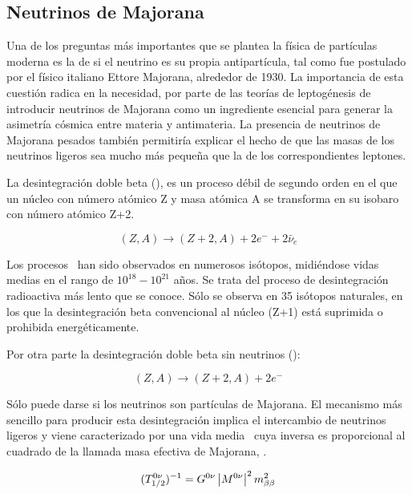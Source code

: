 \subsection*{Neutrinos de Majorana}
Una de los preguntas más importantes que se plantea la física de partículas moderna es la de si el neutrino es su propia antipartícula, tal como fue postulado por el físico italiano Ettore Majorana, alrededor de 1930. La importancia de esta cuestión radica en la necesidad, por parte de las teorías de leptogénesis de introducir neutrinos de Majorana como un ingrediente esencial para generar la asimetría cósmica entre materia y antimateria. La presencia de neutrinos de Majorana pesados también permitiría explicar el hecho de que las masas de los neutrinos ligeros sea mucho más pequeña que la de los correspondientes leptones. 

La desintegración doble beta (\bb), es un proceso débil de segundo orden en el que un núcleo con número atómico Z y masa atómica A se transforma en su isobaro con número atómico 
Z+2.

\begin{equation}
(Z,A) \rightarrow (Z+2,A) + 2 e^- + 2 \bar{\nu}_e
\end{equation}
                                     
Los procesos \bb\ han sido observados en numerosos isótopos, midiéndose vidas medias en el rango de $10^{18} - 10^{21}$ años. Se trata del proceso de desintegración radioactiva más lento que se conoce. Sólo se observa en 35 isótopos naturales, en los que la desintegración beta convencional al núcleo (Z+1) está suprimida o prohibida energéticamente. 

Por otra parte la desintegración doble beta sin neutrinos (\bbonu):
                                     
\begin{equation}
(Z,A) \rightarrow (Z+2,A) + 2 e^- 
\end{equation}
                                     
Sólo puede darse si los neutrinos son partículas de Majorana. El mecanismo más sencillo para producir esta desintegración implica el intercambio de neutrinos ligeros y viene caracterizado por una vida media \Tonu\ cuya inversa es proporcional al cuadrado de la llamada masa efectiva de Majorana, \mbb. 
                                    
\begin{equation}
(T_{1/2}^{0\nu})^{-1} =G^{0\nu} \left|M^{0\nu}\right|^2 m_{\beta\beta}^2
\label{eq.t0nu}
\end{equation}
  
